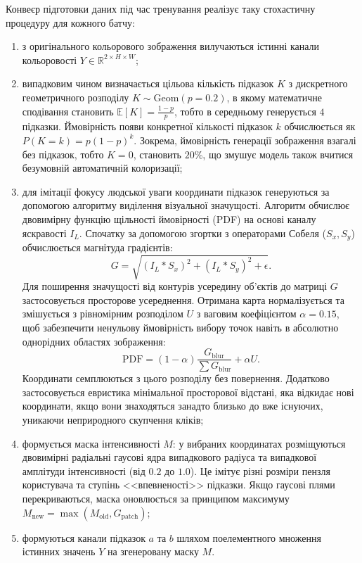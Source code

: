             Конвеєр підготовки даних під час тренування реалізує таку стохастичну процедуру для кожного батчу:
            \begin{enumerate}
                \item з оригінального кольорового зображення вилучаються істинні канали кольоровості $Y \in \mathbb{R}^{2 \times H \times W}$;
                \item випадковим чином визначається цільова кількість підказок $K$ з дискретного геометричного розподілу $K \sim \mathrm{Geom}(p=0.2)$,
                    в якому математичне сподівання становить $\mathbb{E}[K] = \frac{1 - p}{p}$, тобто в середньому генерується $4$ підказки.
                    Ймовірність появи конкретної кількості підказок $k$ обчислюється як $P(K=k) = p(1-p)^k$.
                    Зокрема, ймовірність генерації зображення взагалі без підказок, тобто $K=0$, становить $20\%$, що змушує модель також вчитися безумовній автоматичній колоризації;
                \item для імітації фокусу людської уваги координати підказок генеруються за допомогою алгоритму виділення візуальної значущості.
                    Алгоритм обчислює двовимірну функцію щільності ймовірності (PDF) на основі каналу яскравості $I_L$.
                    Спочатку за допомогою згортки з операторами Собеля ($S_x, S_y$) обчислюється магнітуда градієнтів:
                    \begin{equation*}
                        G = \sqrt{(I_L * S_x)^2 + (I_L * S_y)^2 + \epsilon}.
                    \end{equation*}
                    Для поширення значущості від контурів усередину об'єктів до матриці $G$ застосовується просторове усереднення.
                    Отримана карта нормалізується та змішується з рівномірним розподілом $U$ з ваговим коефіцієнтом $\alpha = 0.15$,
                    щоб забезпечити ненульову ймовірність вибору точок навіть в абсолютно однорідних областях зображення:
                    \begin{equation*}
                        \mathrm{PDF} = (1 - \alpha) \frac{G_{\mathrm{blur}}}{\sum G_{\mathrm{blur}}} + \alpha U.
                    \end{equation*}
                    Координати семплюються з цього розподілу без повернення.
                    Додатково застосовується евристика мінімальної просторової відстані, яка відкидає нові координати, якщо вони знаходяться занадто близько до вже існуючих, уникаючи неприродного скупчення кліків;
                \item формується маска інтенсивності $M$: у вибраних координатах розміщуються двовимірні радіальні гаусові ядра випадкового радіуса та випадкової амплітуди інтенсивності (від $0.2$ до $1.0$).
                    Це імітує різні розміри пензля користувача та ступінь <<впевненості>> підказки.
                    Якщо гаусові плями перекриваються, маска оновлюється за принципом максимуму $M_{\mathrm{new}} = \max(M_{\mathrm{old}}, G_{\mathrm{patch}})$;
                \item формуються канали підказок $a$ та $b$ шляхом поелементного множення істинних значень $Y$ на згенеровану маску $M$.
            \end{enumerate}

